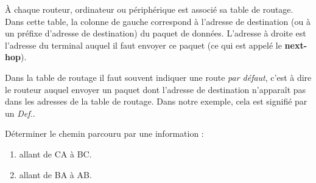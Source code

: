 \documentclass[11pt, a4paper]{book}
\begin{document}
\begin{center}
\end{center}


À chaque routeur, ordinateur ou périphérique est associé sa table de routage. Dans cette table, la colonne de gauche correspond à l'adresse de destination (ou à un préfixe d'adresse de destination) du paquet de données. L'adresse à droite est l'adresse du terminal auquel il faut envoyer ce paquet (ce qui est appelé le {\bf next-hop}).

Dans la table de routage il faut souvent indiquer une route {\it par défaut}, c'est à dire le routeur auquel envoyer un paquet dont l'adresse de destination n'apparaît pas dans les adresses de la table de routage.  Dans notre exemple, cela est signifié par un {\it Def.}.

\begin{exercice}
Déterminer le chemin parcouru par une information :
\begin{enumerate}
\item allant de CA à BC.
\item allant de BA à AB.
\end{enumerate}
\end{exercice}

\newpage
\end{document}
